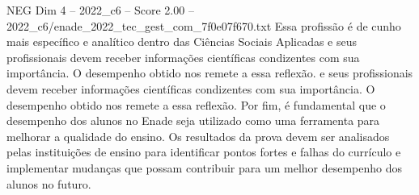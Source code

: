 \begin{textsample}{NEG Dim 4 – 2022\_c6 – Score 2.00 – 2022\_c6/enade\_2022\_tec\_gest\_com\_7f0e07f670.txt}
Essa profissão é de cunho mais específico e analítico dentro das Ciências Sociais Aplicadas e seus profissionais devem receber informações científicas condizentes com sua importância.
O desempenho obtido nos remete a essa reflexão. e seus profissionais devem receber informações científicas condizentes com sua importância.
O desempenho obtido nos remete a essa reflexão.
Por fim, é fundamental que o desempenho dos alunos no Enade seja utilizado como uma ferramenta para melhorar a qualidade do ensino.
Os resultados da prova devem ser analisados pelas instituições de ensino para identificar pontos fortes e falhas do currículo e implementar mudanças que possam contribuir para um melhor desempenho dos alunos no futuro.

\end{textsample}
